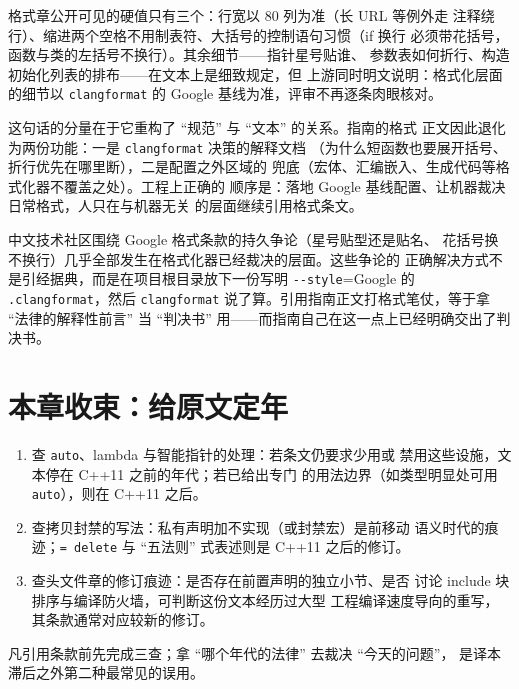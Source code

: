 \documentclass[12pt,a4paper,fontset=fandol]{ctexbook}
\newcommand{\cpp}[1]{C++#1}
\newcommand{\Tp}[1]{\texttt{#1}}
\newcommand{\Opt}[1]{\texttt{-\/-#1}}
\newcommand{\Bk}{\discretionary{}{}{}}
\begin{document}
格式章公开可见的硬值只有三个：行宽以 80 列为准（长 URL 等例外走
注释绕行）、缩进两个空格不用制表符、大括号的控制语句习惯（if 换行
必须带花括号，函数与类的左括号不换行）。其余细节——指针星号贴谁、
参数表如何折行、构造初始化列表的排布——在文本上是细致规定，但
上游同时明文说明：格式化层面的细节以 \Tp{clang{\Bk}format} 的
Google 基线为准，评审不再逐条肉眼核对。

这句话的分量在于它重构了 ``规范'' 与 ``文本'' 的关系。指南的格式
正文因此退化为两份功能：一是 \Tp{clang{\Bk}format} 决策的解释文档
（为什么短函数也要展开括号、折行优先在哪里断），二是配置之外区域的
兜底（宏体、汇编嵌入、生成代码等格式化器不覆盖之处）。工程上正确的
顺序是：落地 Google 基线配置、让机器裁决日常格式，人只在与机器无关
的层面继续引用格式条文。

\begin{warning}[title={把机器裁决当辩论素材}]
中文技术社区围绕 Google 格式条款的持久争论（星号贴型还是贴名、
花括号换不换行）几乎全部发生在格式化器已经裁决的层面。这些争论的
正确解决方式不是引经据典，而是在项目根目录放下一份写明
\Opt{style}=Google 的 \Tp{.clang{\Bk}format}，然后 \Tp{clang{\Bk}format}
说了算。引用指南正文打格式笔仗，等于拿 ``法律的解释性前言'' 当
``判决书'' 用——而指南自己在这一点上已经明确交出了判决书。
\end{warning}

\section{本章收束：给原文定年}
\label{sec:ch02-close}

\begin{guideline}[title={读原文前：版本与语言标准年代三查}]
\begin{enumerate}
  \item 查 \Tp{auto}、lambda 与智能指针的处理：若条文仍要求少用或
        禁用这些设施，文本停在 \cpp{11} 之前的年代；若已给出专门
        的用法边界（如类型明显处可用 \Tp{auto}），则在 \cpp{11} 之后。
  \item 查拷贝封禁的写法：私有声明加不实现（或封禁宏）是前移动
        语义时代的痕迹；\Tp{= delete} 与 ``五法则'' 式表述则是
        \cpp{11} 之后的修订。
  \item 查头文件章的修订痕迹：是否存在前置声明的独立小节、是否
        讨论 include 块排序与编译防火墙，可判断这份文本经历过大型
        工程编译速度导向的重写，其条款通常对应较新的修订。
\end{enumerate}
凡引用条款前先完成三查；拿 ``哪个年代的法律'' 去裁决 ``今天的问题''，
是译本滞后之外第二种最常见的误用。
\end{guideline}
\end{document}
